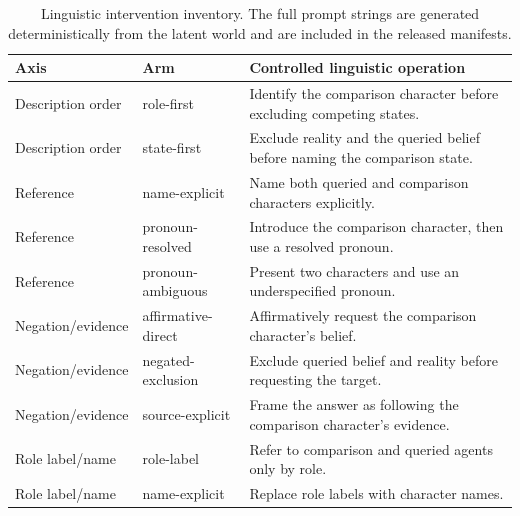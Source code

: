 \begin{table}[H]
\centering
\footnotesize
\begin{tabularx}{\textwidth}{llX}
\toprule
Axis & Arm & Controlled linguistic operation \\
\midrule
Description order & role-first & Identify the comparison character before excluding competing states. \\
Description order & state-first & Exclude reality and the queried belief before naming the comparison state. \\
Reference & name-explicit & Name both queried and comparison characters explicitly. \\
Reference & pronoun-resolved & Introduce the comparison character, then use a resolved pronoun. \\
Reference & pronoun-ambiguous & Present two characters and use an underspecified pronoun. \\
Negation/evidence & affirmative-direct & Affirmatively request the comparison character's belief. \\
Negation/evidence & negated-exclusion & Exclude queried belief and reality before requesting the target. \\
Negation/evidence & source-explicit & Frame the answer as following the comparison character's evidence. \\
Role label/name & role-label & Refer to comparison and queried agents only by role. \\
Role label/name & name-explicit & Replace role labels with character names. \\
\bottomrule
\end{tabularx}
\caption{Linguistic intervention inventory. The full prompt strings are generated deterministically from the latent world and are included in the released manifests.}
\label{tab:linguistic-arms}
\end{table}

